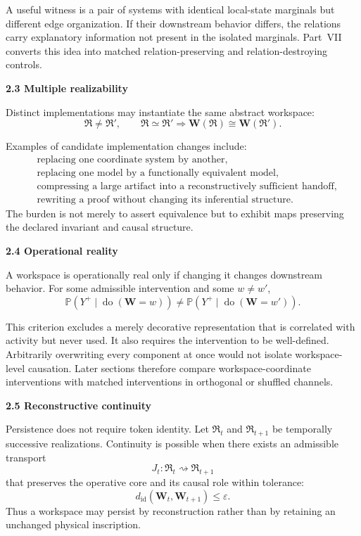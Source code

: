 \documentclass[11pt,letterpaper]{article}
\newcommand{\Workspace}{\mathbf W}
\newcommand{\subtopic}[1]{%
 \vspace{0.45em}
 {\bfseries\color{AccentColor} #1\par}
}
\theoremstyle{plain}
\theoremstyle{definition}
\begin{document}
A useful witness is a pair of systems with identical local-state marginals but
different edge organization. If their downstream behavior differs, the
relations carry explanatory information not present in the isolated marginals.
Part~VII converts this idea into matched relation-preserving and
relation-destroying controls.

\subtopic{2.3 Multiple realizability}

Distinct implementations may instantiate the same abstract workspace:
\[
\mathfrak R\neq\mathfrak R',
\qquad
\mathfrak R\simeq\mathfrak R'
\Longrightarrow
\Workspace(\mathfrak R)\cong\Workspace(\mathfrak R').
\]

Examples of candidate implementation changes include:
\[
\begin{aligned}
&\text{replacing one coordinate system by another},\\
&\text{replacing one model by a functionally equivalent model},\\
&\text{compressing a large artifact into a reconstructively sufficient handoff},\\
&\text{rewriting a proof without changing its inferential structure}.
\end{aligned}
\]
The burden is not merely to assert equivalence but to exhibit maps preserving
the declared invariant and causal structure.

\subtopic{2.4 Operational reality}

A workspace is operationally real only if changing it changes downstream
behavior. For some admissible intervention and some \(w\neq w'\),
\[
\mathbb P\!\left(
Y^+\mid\operatorname{do}(\Workspace=w)
\right)
\neq
\mathbb P\!\left(
Y^+\mid\operatorname{do}(\Workspace=w')
\right).
\]

This criterion excludes a merely decorative representation that is correlated
with activity but never used. It also requires the intervention to be
well-defined. Arbitrarily overwriting every component at once would not
isolate workspace-level causation. Later sections therefore compare
workspace-coordinate interventions with matched interventions in orthogonal
or shuffled channels.

\subtopic{2.5 Reconstructive continuity}

Persistence does not require token identity. Let \(\mathfrak R_t\) and
\(\mathfrak R_{t+1}\) be temporally successive realizations. Continuity is
possible when there exists an admissible transport
\[
J_t:\mathfrak R_t\rightsquigarrow\mathfrak R_{t+1}
\]
that preserves the operative core and its causal role within tolerance:
\[
d_{\mathrm{id}}(\Workspace_t,\Workspace_{t+1})\leq\varepsilon.
\]
Thus a workspace may persist by reconstruction rather than by retaining an
unchanged physical inscription.
\end{document}

